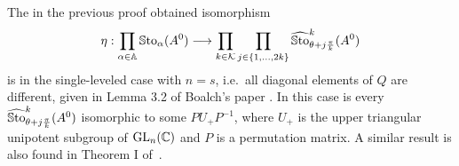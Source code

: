 \begin{rem}
  The in the previous proof obtained isomorphism
  \[
    \eta: \prod_{\alpha\in\mathbb{A}}\operatorname{\mathbb{S}to}_{\alpha}(A^0) \longrightarrow
    \prod_{k\in\mathcal{K}} \prod_{j\in\{1,\dots,2k\}}
    \widehat{\operatorname{\mathbb{S}to}}_{\theta+j\frac{\pi}{k}}^k(A^0)
  \]
  is in the single-leveled case with $n=s$, i.e.\ all diagonal elements of $Q$
  are different, given in Lemma 3.2 of Boalch's paper \cite[Lem.3.2]{boalch}.
  In this case is every $\widehat{\operatorname{\mathbb{S}to}}_{\theta+j\frac{\pi}{k}}^k(A^0)$ isomorphic to
  some $PU_+P^{-1}$, where $U_+$ is the upper triangular unipotent subgroup of
  $\operatorname{GL}_n(\mathbb{C})$ and $P$ is a permutation matrix.
  A similar result is also found in Theorem I of~\cite{BJL1979Birkhoff}.
\end{rem}

